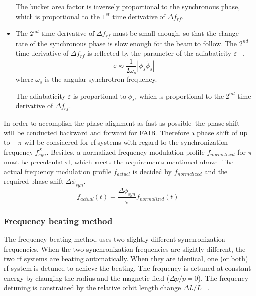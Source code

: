 \begin{itemize}
The bucket area factor is inversely proportional to the synchronous phase, which is proportional to the $1^\mathit{st}$ time derivative of $\Delta f_\mathit{rf}$.
	\item The $2^\mathit{nd}$ time derivative of $\Delta f_\mathit{rf}$ must be small enough, so that the change rate of the synchronous phase is slow enough for the beam to follow. The $2^\mathit{nd}$ time derivative of $\Delta f_\mathit{rf}$ is reflected by the parameter of the adiabaticity $\varepsilon$ ~\cite{ezura_beam-dynamics_2008}.
\begin{equation}
\varepsilon \approx \frac{1}{2\omega_s}|\phi_s\dot{\phi_{s}}|
\label{eq:derivation1}
\end{equation} 
where $\omega_s$ is the angular synchrotron frequency.

The adiabaticity $\varepsilon$ is proportional to $\dot{\phi_{s}}$, which is proportional to the $2^\mathit{nd}$ time derivative of $\Delta f_\mathit{rf}$.
\end{itemize}

In order to accomplish the phase alignment as fast as possible, the phase shift will be conducted backward and forward for FAIR. Therefore a phase shift of up to $\pm \pi$ will be considered for rf systems with regard to the synchronization frequency $f_\mathit{syn}^X$. Besides, a normalized frequency modulation profile $f_{normalized}$ for $\pi$ must be precalculated, which meets the requirements mentioned above. The actual frequency modulation profile $f_{actual}$ is decided by $f_{normalized}$ and the required phase shift $\Delta \phi_\mathit{syn}$. 
\begin{equation}
f_{\mathit{actual}}(t)=\frac{\Delta \phi_\mathit{syn}}{\pi}f_{\mathit{normalized}}(t) \label{actual_profile}
\end{equation}
 

\subsubsection{Frequency beating method}
The frequency beating method uses two slightly different synchronization frequencies. When the two synchronization frequencies are slightly different, the two rf systems are beating automatically. When they are identical, one (or both) rf system is detuned to achieve the beating. The frequency is detuned at constant energy by changing the radius and the magnetic field ($\Delta{p}/{p}=0$). The frequency detuning is constrained by the relative orbit length change $\Delta{L}/{L}$ ~\cite{bovet_selection_1970}. 


